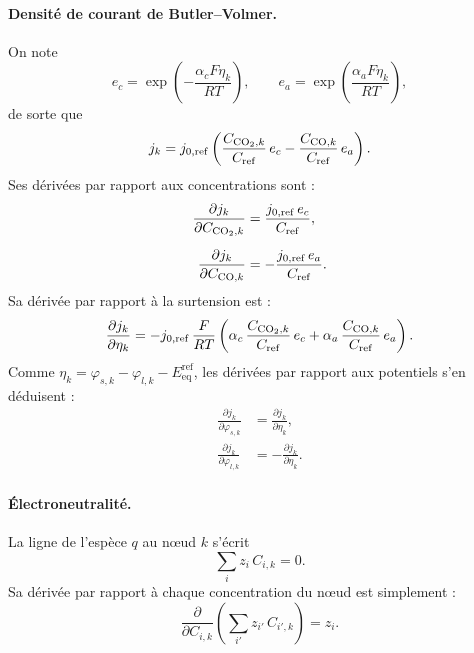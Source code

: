 \paragraph{Densité de courant de Butler--Volmer.} On note
\begin{equation*}
e_c = \exp\!\left(-\frac{\alpha_c F\eta_k}{RT}\right),
\qquad
e_a = \exp\!\left(\frac{\alpha_a F\eta_k}{RT}\right),
\end{equation*}
de sorte que
\begin{equation*}
j_k = j_{0,\mathrm{ref}}
\left(\frac{C_{\ce{CO2},k}}{C_{\mathrm{ref}}}\,e_c
- \frac{C_{\ce{CO},k}}{C_{\mathrm{ref}}}\,e_a\right) .
\end{equation*}
Ses dérivées par rapport aux concentrations sont :
\begin{align*}
\frac{\partial j_k}{\partial C_{\ce{CO2},k}} &= \frac{j_{0,\mathrm{ref}}\,e_c}{C_{\mathrm{ref}}} ,\\[0.2cm]
\frac{\partial j_k}{\partial C_{\ce{CO},k}} &= -\frac{j_{0,\mathrm{ref}}\,e_a}{C_{\mathrm{ref}}} .
\end{align*}
Sa dérivée par rapport à la surtension est :
\begin{equation*}
\frac{\partial j_k}{\partial \eta_k}
= -j_{0,\mathrm{ref}}\,\frac{F}{RT}
\left(\alpha_c\,\frac{C_{\ce{CO2},k}}{C_{\mathrm{ref}}}\,e_c
+ \alpha_a\,\frac{C_{\ce{CO},k}}{C_{\mathrm{ref}}}\,e_a\right) .
\end{equation*}
Comme $\eta_k = \varphi_{s,k} - \varphi_{l,k} - E_{\mathrm{eq}}^{\mathrm{ref}}$,
les dérivées par rapport aux potentiels s'en déduisent :
\begin{align*}
\frac{\partial j_k}{\partial \varphi_{s,k}} &= \frac{\partial j_k}{\partial \eta_k} ,\\[0.2cm]
\frac{\partial j_k}{\partial \varphi_{l,k}} &= -\frac{\partial j_k}{\partial \eta_k} .
\end{align*}

\paragraph{Électroneutralité.} La ligne de l'espèce $q$ au nœud $k$ s'écrit
\begin{equation*}
\sum_i z_i\,C_{i,k} = 0 .
\end{equation*}
Sa dérivée par rapport à chaque concentration du nœud est simplement :
\begin{equation*}
\frac{\partial}{\partial C_{i,k}}\left(\sum_{i'} z_{i'}\,C_{i',k}\right) = z_i .
\end{equation*}

